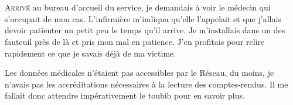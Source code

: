 \chapter{}

\lettrine[lines=1]{A}{rrivé} au bureau d'accueil du service, je demandais à voir le médecin qui s'occupait de mon cas.
L'infirmière m'indiqua qu'elle l'appelait et que j'allais devoir patienter un petit peu le temps qu'il arrive. Je
m'installais dans un des fauteuil près de là et pris mon mal en patience. J'en  profitais pour relire rapidement ce que
je savais déjà de ma victime.

Les données médicales n'étaient pas accessibles par le Réseau, du moins, je n'avais pas les accréditations nécessaires à
la lecture des comptes-rendus. Il me fallait donc attendre impérativement le toubib pour en savoir plus. 
